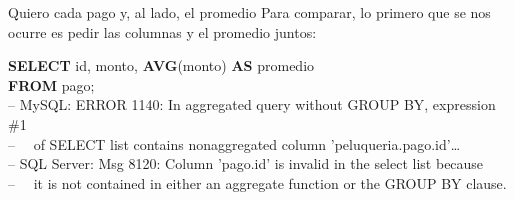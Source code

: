 \documentclass[aspectratio=169,10pt,c]{beamer}
\newcommand{\kw}[1]{\textcolor{utpRojo}{\textbf{#1}}}
\newcommand{\mal}[1]{{\setlength{\fboxsep}{1.2pt}\colorbox{utpRojo!18}{#1}}}
\newenvironment{sqlcode}[1][.86\textwidth]
  {\begin{center}\begin{lrbox}{\sqlbuf}\begin{minipage}{#1}\ttfamily\footnotesize\vspace{6pt}\raggedright}
  {\vspace{6pt}\end{minipage}\end{lrbox}\colorbox{utpGrisClaro}{\usebox{\sqlbuf}}\end{center}}
\newcommand{\err}[1]{\textcolor{utpRojo}{#1}}
\newcommand{\forma}[2]{{\ttfamily\footnotesize\renewcommand{\arraystretch}{1.25}%
  \begin{tabular}{#1}\hline #2\end{tabular}}}
\begin{document}
\begin{frame}{Quiero cada pago y, al lado, el promedio}
\small Para comparar, lo primero que se nos ocurre es pedir las columnas y el promedio juntos:
\begin{sqlcode}[.8\textwidth]
\kw{SELECT} \mal{id}, \mal{monto}, \kw{AVG}(monto) \kw{AS} promedio\\
\kw{FROM} pago;\\[5pt]
\scriptsize\err{-- MySQL: ERROR 1140: In aggregated query without GROUP BY, expression \#1}\\
\scriptsize\err{-- \ \ of SELECT list contains nonaggregated column 'peluqueria.pago.id'\ldots}\\
\scriptsize\err{-- SQL Server: Msg 8120: Column 'pago.id' is invalid in the select list because}\\
\scriptsize\err{-- \ \ it is not contained in either an aggregate function or the GROUP BY clause.}
\end{sqlcode}
\vspace{-0.2cm}
\begin{center}
\end{center}
\vspace{0.1cm}
\end{frame}
\end{document}
